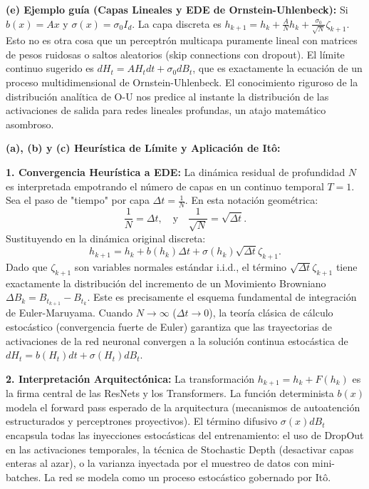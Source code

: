 \documentclass[11pt, letterpaper]{article}
\begin{document}
\vspace{5mm}

\begin{solucion}
    \textbf{(e) Ejemplo guía (Capas Lineales y EDE de Ornstein-Uhlenbeck):}
    Si $b(x) = Ax$ y $\sigma(x) = \sigma_0 I_d$.
    La capa discreta es $h_{k+1} = h_k + \frac{A}{N} h_k + \frac{\sigma_0}{\sqrt{N}} \zeta_{k+1}$. Esto no es otra cosa que un perceptrón multicapa puramente lineal con matrices de pesos ruidosas o saltos aleatorios (skip connections con dropout).
    El límite continuo sugerido es $dH_t = A H_t dt + \sigma_0 dB_t$, que es exactamente la ecuación de un proceso multidimensional de Ornstein-Uhlenbeck. El conocimiento riguroso de la distribución analítica de O-U nos predice al instante la distribución de las activaciones de salida para redes lineales profundas, un atajo matemático asombroso.

    \textbf{(a), (b) y (c) Heurística de Límite y Aplicación de Itô:}

    \textbf{1. Convergencia Heurística a EDE:}
    La dinámica residual de profundidad $N$ es interpretada empotrando el número de capas en un continuo temporal $T=1$. 
    Sea el paso de "tiempo" por capa $\Delta t = \frac{1}{N}$.
    En esta notación geométrica:
    \[ \frac{1}{N} = \Delta t, \quad \text{y} \quad \frac{1}{\sqrt{N}} = \sqrt{\Delta t}. \]
    Sustituyendo en la dinámica original discreta:
    \[ h_{k+1} = h_k + b(h_k) \Delta t + \sigma(h_k) \sqrt{\Delta t} \zeta_{k+1}. \]
    Dado que $\zeta_{k+1}$ son variables normales estándar i.i.d., el término $\sqrt{\Delta t} \zeta_{k+1}$ tiene exactamente la distribución del incremento de un Movimiento Browniano $\Delta B_k = B_{t_{k+1}} - B_{t_k}$.
    Este es precisamente el esquema fundamental de integración de Euler-Maruyama. Cuando $N \to \infty$ ($\Delta t \to 0$), la teoría clásica de cálculo estocástico (convergencia fuerte de Euler) garantiza que las trayectorias de activaciones de la red neuronal convergen a la solución continua estocástica de $dH_t = b(H_t)dt + \sigma(H_t)dB_t$.

    \textbf{2. Interpretación Arquitectónica:}
    La transformación $h_{k+1} = h_k + F(h_k)$ es la firma central de las ResNets y los Transformers.
    La función determinista $b(x)$ modela el forward pass esperado de la arquitectura (mecanismos de autoatención estructurados y perceptrones proyectivos).
    El término difusivo $\sigma(x) dB_t$ encapsula todas las inyecciones estocásticas del entrenamiento: el uso de DropOut en las activaciones temporales, la técnica de Stochastic Depth (desactivar capas enteras al azar), o la varianza inyectada por el muestreo de datos con mini-batches. La red se modela como un proceso estocástico gobernado por Itô.


\end{solucion}
\end{document}
